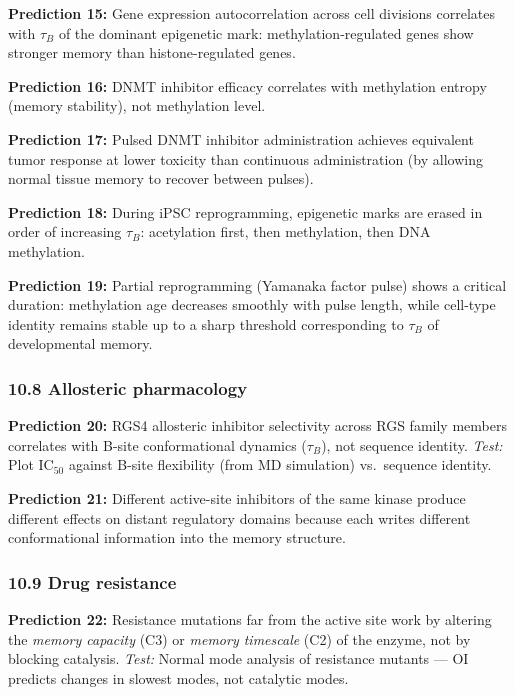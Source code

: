 \documentclass[
  11pt,
]{article}
\begin{document}
\textbf{Prediction 15:} Gene expression autocorrelation across cell
divisions correlates with \(\tau_B\) of the dominant epigenetic mark:
methylation-regulated genes show stronger memory than histone-regulated
genes.

\textbf{Prediction 16:} DNMT inhibitor efficacy correlates with
methylation entropy (memory stability), not methylation level.

\textbf{Prediction 17:} Pulsed DNMT inhibitor administration achieves
equivalent tumor response at lower toxicity than continuous
administration (by allowing normal tissue memory to recover between
pulses).

\textbf{Prediction 18:} During iPSC reprogramming, epigenetic marks are
erased in order of increasing \(\tau_B\): acetylation first, then
methylation, then DNA methylation.

\textbf{Prediction 19:} Partial reprogramming (Yamanaka factor pulse)
shows a critical duration: methylation age decreases smoothly with pulse
length, while cell-type identity remains stable up to a sharp threshold
corresponding to \(\tau_B\) of developmental memory.

\hypertarget{allosteric-pharmacology}{%
\subsubsection{10.8 Allosteric
pharmacology}\label{allosteric-pharmacology}}

\textbf{Prediction 20:} RGS4 allosteric inhibitor selectivity across RGS
family members correlates with B-site conformational dynamics
(\(\tau_B\)), not sequence identity. \emph{Test:} Plot IC\(_{50}\)
against B-site flexibility (from MD simulation) vs.~sequence identity.

\textbf{Prediction 21:} Different active-site inhibitors of the same
kinase produce different effects on distant regulatory domains because
each writes different conformational information into the memory
structure.

\hypertarget{drug-resistance}{%
\subsubsection{10.9 Drug resistance}\label{drug-resistance}}

\textbf{Prediction 22:} Resistance mutations far from the active site
work by altering the \emph{memory capacity} (C3) or \emph{memory
timescale} (C2) of the enzyme, not by blocking catalysis. \emph{Test:}
Normal mode analysis of resistance mutants --- OI predicts changes in
slowest modes, not catalytic modes.
\end{document}
